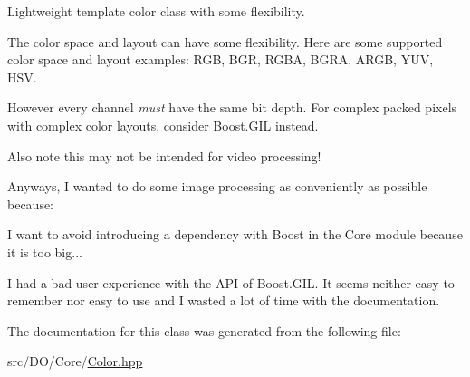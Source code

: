Lightweight template color class with some flexibility. 

The color space and layout can have some flexibility. Here are some supported color space and layout examples\-: R\-G\-B, B\-G\-R, R\-G\-B\-A, B\-G\-R\-A, A\-R\-G\-B, Y\-U\-V, H\-S\-V.

However every channel {\itshape must} have the same bit depth. For complex packed pixels with complex color layouts, consider Boost.\-G\-I\-L instead.

Also note this may not be intended for video processing!

Anyways, I wanted to do some image processing as conveniently as possible because\-:
\begin{DoxyItemize}
\item I want to avoid introducing a dependency with Boost in the Core module because it is too big...
\item I had a bad user experience with the A\-P\-I of Boost.\-G\-I\-L. It seems neither easy to remember nor easy to use and I wasted a lot of time with the documentation. 
\end{DoxyItemize}

The documentation for this class was generated from the following file\-:\begin{DoxyCompactItemize}
\item 
src/\-D\-O/\-Core/\hyperlink{_color_8hpp}{Color.\-hpp}\end{DoxyCompactItemize}
